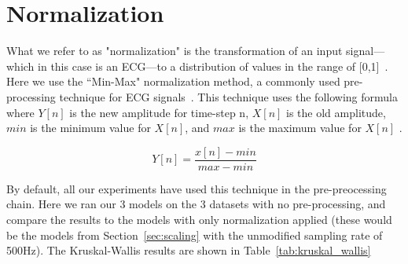 \documentclass[pmlr,twocolumn]{jmlr}%
\begin{document}
    



\section{Normalization}
\label{sec:Norm}
What we refer to as "normalization" is the transformation of an input signal---which in this case is an ECG---to a distribution of values in the range of [0,1]~\cite{hong2022practical}. Here we use the ``Min-Max" normalization method, a commonly used pre-processing technique for ECG signals~\cite{uwaechia2021comprehensive,li2010robust,li2019identifying,fang2009human}. This technique uses the following formula where $Y[n]$ is the new amplitude for time-step n, $X[n]$ is the old amplitude, $min$ is the minimum value for $X[n]$, and $max$ is the maximum value for $X[n]$ \cite{uwaechia2021comprehensive}.

\[ Y[n] = \frac{x[n]-min}{max-min} \]

By default, all our experiments have used this technique in the pre-preocessing chain. Here we ran our 3 models on the 3 datasets with no pre-processing, and compare the results to the models with only normalization applied (these would be the models from Section~\ref{sec:scaling} with the unmodified sampling rate of 500Hz). The Kruskal-Wallis results are shown in Table~\ref{tab:kruskal_wallis}
\end{document}
